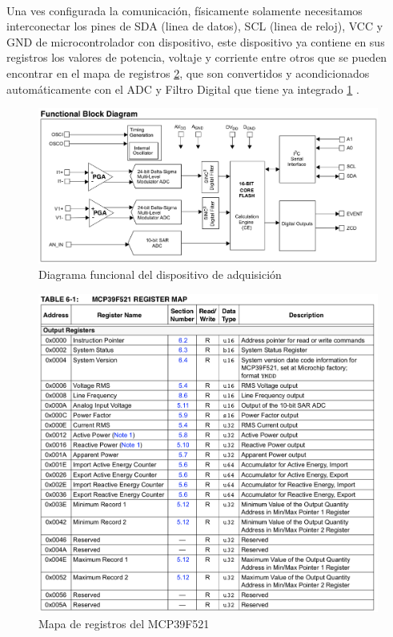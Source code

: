 \paragraph{}
Una ves configurada la comunicación, físicamente solamente necesitamos interconectar los pines de SDA (linea de datos), SCL (linea de reloj), VCC y GND de microcontrolador con dispositivo, este dispositivo ya contiene en sus registros los valores de potencia, voltaje y corriente entre otros que se pueden encontrar en el mapa de registros \ref{fig:Mapa de registros del MCP39F521}, que son convertidos y acondicionados automáticamente con el ADC y Filtro Digital que tiene ya integrado \ref{fig:Diagrama funcional} .

\begin{figure}[H]
	\centering
	\includegraphics[scale=.4]{Capitulo5/images/MCP_diagrama_funcional.png}
	\caption{Diagrama funcional del dispositivo de adquisición}
	\label{fig:Diagrama funcional}
\end{figure}

\begin{figure}[H]
	\centering
	\includegraphics[scale=.5]{Capitulo5/images/register_map.png}
	\caption{Mapa de registros del MCP39F521}
	\label{fig:Mapa de registros del MCP39F521}
\end{figure}

